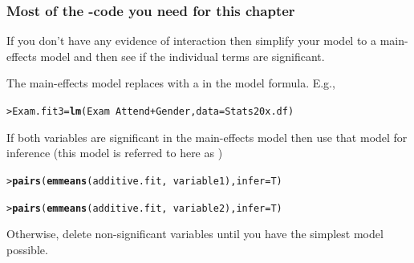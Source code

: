 \documentclass{beamer}\usepackage[]{graphicx}\usepackage[]{xcolor}
\makeatletter
\newcommand{\hlopt}[1]{\textcolor[rgb]{0,0,0}{#1}}%
\newcommand{\hlstd}[1]{\textcolor[rgb]{0.345,0.345,0.345}{#1}}%
\newcommand{\hlkwb}[1]{\textcolor[rgb]{0.69,0.353,0.396}{#1}}%
\newcommand{\hlkwc}[1]{\textcolor[rgb]{0.333,0.667,0.333}{#1}}%
\newcommand{\hlkwd}[1]{\textcolor[rgb]{0.737,0.353,0.396}{\textbf{#1}}}%
\newenvironment{kframe}{%
 \def\at@end@of@kframe{}%
 \ifinner\ifhmode%
  \def\at@end@of@kframe{\end{minipage}}%
  \begin{minipage}{\columnwidth}%
 \fi\fi%
 \def\FrameCommand##1{\hskip\@totalleftmargin \hskip-\fboxsep
 \colorbox{shadecolor}{##1}\hskip-\fboxsep
     \hskip-\linewidth \hskip-\@totalleftmargin \hskip\columnwidth}%
 \MakeFramed {\advance\hsize-\width
   \@totalleftmargin\z@ \linewidth\hsize
   \@setminipage}}%
 {\par\unskip\endMakeFramed%
 \at@end@of@kframe}
\newenvironment{knitrout}{}{} %
\makeatother
\begin{document}
\begin{frame}[fragile]
\end{frame}



\begin{frame}[fragile]
\frametitle{Most of the -code you need for this chapter}

If you don't have any evidence of interaction then simplify your model to a main-effects model and then see if the individual terms are significant. 
\medskip

The main-effects model replaces \rcode{*} with  a \rcode{+} in the model formula. E.g.,
\begin{knitrout}\scriptsize
{}\color{fgcolor}\begin{kframe}
\begin{alltt}
\hlstd{> }\hlstd{Exam.fit3}\hlkwb{=}\hlkwd{lm}\hlstd{(Exam} \hlopt{~} \hlstd{Attend}\hlopt{+}\hlstd{Gender,} \hlkwc{data} \hlstd{= Stats20x.df)}
\end{alltt}
\end{kframe}
\end{knitrout}
\bigskip

If both variables are significant in the main-effects model then use that model for inference (this model is referred to here as ) 

\begin{knitrout}\scriptsize
{}\color{fgcolor}\begin{kframe}
\begin{alltt}
\hlstd{> }\hlkwd{pairs}\hlstd{(}\hlkwd{emmeans}\hlstd{(additive.fit,} \hlopt{~} \hlstd{variable1),} \hlkwc{infer}\hlstd{=T)}
\end{alltt}
\end{kframe}
\end{knitrout}

\begin{knitrout}\scriptsize
{}\color{fgcolor}\begin{kframe}
\begin{alltt}
\hlstd{> }\hlkwd{pairs}\hlstd{(}\hlkwd{emmeans}\hlstd{(additive.fit,} \hlopt{~} \hlstd{variable2),} \hlkwc{infer}\hlstd{=T)}
\end{alltt}
\end{kframe}
\end{knitrout}
\bigskip

Otherwise, delete non-significant variables until you have the simplest model possible.
\end{frame}
\end{document}

